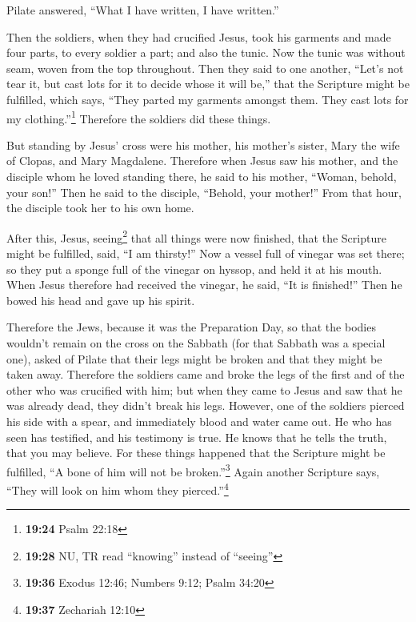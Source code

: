  Pilate answered, ``What I have written, I have
written.''

 Then the soldiers, when they had crucified Jesus, took
his garments and made four parts, to every soldier a part; and also the
tunic. Now the tunic was without seam, woven from the top throughout.
 Then they said to one another, ``Let's not tear it, but
cast lots for it to decide whose it will be,'' that the Scripture might
be fulfilled, which says, ``They parted my garments amongst them. They
cast lots for my clothing.''\footnote{\textbf{19:24} Psalm 22:18}
Therefore the soldiers did these things.

 But standing by Jesus' cross were his mother, his
mother's sister, Mary the wife of Clopas, and Mary Magdalene.
 Therefore when Jesus saw his mother, and the disciple
whom he loved standing there, he said to his mother, ``Woman, behold,
your son!''  Then he said to the disciple, ``Behold, your
mother!'' From that hour, the disciple took her to his own home.

 After this, Jesus, seeing\footnote{\textbf{19:28} NU, TR
  read ``knowing'' instead of ``seeing''} that all things were now
finished, that the Scripture might be fulfilled, said, ``I am thirsty!''
 Now a vessel full of vinegar was set there; so they put
a sponge full of the vinegar on hyssop, and held it at his mouth.
 When Jesus therefore had received the vinegar, he said,
``It is finished!'' Then he bowed his head and gave up his spirit.

 Therefore the Jews, because it was the Preparation Day,
so that the bodies wouldn't remain on the cross on the Sabbath (for that
Sabbath was a special one), asked of Pilate that their legs might be
broken and that they might be taken away.  Therefore the
soldiers came and broke the legs of the first and of the other who was
crucified with him;  but when they came to Jesus and saw
that he was already dead, they didn't break his legs. 
However, one of the soldiers pierced his side with a spear, and
immediately blood and water came out.  He who has seen
has testified, and his testimony is true. He knows that he tells the
truth, that you may believe.  For these things happened
that the Scripture might be fulfilled, ``A bone of him will not be
broken.''\footnote{\textbf{19:36} Exodus 12:46; Numbers 9:12; Psalm
  34:20}  Again another Scripture says, ``They will look
on him whom they pierced.''\footnote{\textbf{19:37} Zechariah 12:10}

